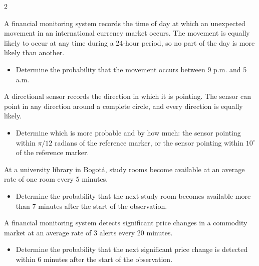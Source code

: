 \begin{multicols}{2}
		{
		A financial monitoring system records the time of day at which an
		unexpected movement in an international currency market occurs. The
		movement is equally likely to occur at any time during a 24-hour period,
		so no part of the day is more likely than another.
		
		\begin{itemize}
			\item[\textbf{(C3)}] Determine the probability that the movement occurs between 9 p.m.	and 5 a.m.
		\end{itemize}
		}
		
		\columnbreak
		
		{
		A directional sensor records the direction in which it is pointing.
		The sensor can point in any direction around a complete circle, and
		every direction is equally likely. 
		
		\begin{itemize}
			\item[\textbf{(C3)}] Determine which is
			more probable and by how much: the sensor pointing within \(\pi/12\) radians of the reference marker, or the sensor pointing within \(10^\circ\) of the reference marker.
		\end{itemize}
		}
		
		{
		At a university library in Bogotá, study rooms become available at an
		average rate of one room every 5 minutes.
		
		\begin{itemize}
			\item[\textbf{(C4)}] Determine the probability that the next study
			room becomes available more than 7 minutes after the start of the
			observation.
		\end{itemize}
		}
	
		{
		A financial monitoring system detects significant price changes in a
		commodity market at an average rate of 3 alerts every 20 minutes.
		
		\begin{itemize}
			\item[\textbf{(C4)}] Determine the probability that the next
			significant price change is detected within 6 minutes after the
			start of the observation.
		\end{itemize}
		}
		

\end{multicols}
